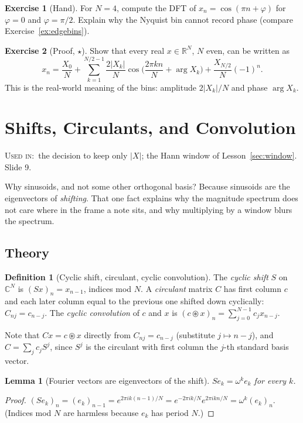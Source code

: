 \documentclass[11pt]{article}
\newtheorem{lemma}[theorem]{Lemma}
\theoremstyle{definition}
\newtheorem{definition}[theorem]{Definition}
\newtheorem{innerexercise}{Exercise}[section]
\newenvironment{exercise}[1][]{\begin{innerexercise}[#1]}{\end{innerexercise}}
\newcommand{\R}{\mathbb{R}}
\newcommand{\C}{\mathbb{C}}
\newcommand{\abs}[1]{\lvert #1\rvert}
\newcommand{\cconv}{\circledast}
\newcommand{\usedin}[1]{\par\noindent\colorbox{black!8}{\parbox{\dimexpr\linewidth-2\fboxsep\relax}{\small\textsc{Used in:}~#1}}\par\medskip}
\begin{document}
\begin{exercise}[Hand]\label{ex:nyq}
For $N=4$, compute the DFT of $x_n=\cos(\pi n+\varphi)$ for $\varphi=0$ and
$\varphi=\pi/2$. Explain why the Nyquist bin cannot record phase (compare
Exercise~\ref{ex:edgebins}).
\end{exercise}

\begin{exercise}[Proof, $\star$]\label{ex:realseries}
Show that every real $x\in\R^N$, $N$ even, can be written as
\[
x_n=\frac{X_0}N+\sum_{k=1}^{N/2-1}\frac{2\abs{X_k}}N\cos\!\Big(\frac{2\pi kn}N+\arg X_k\Big)
+\frac{X_{N/2}}N(-1)^n.
\]
This is the real-world meaning of the bins: amplitude $2\abs{X_k}/N$ and phase
$\arg X_k$.
\end{exercise}

\section{Shifts, Circulants, and Convolution}\label{sec:circ}
\usedin{the decision to keep only $\abs{X}$; the Hann window of
Lesson~\ref{sec:window}. Slide 9.}

Why sinusoids, and not some other orthogonal basis? Because sinusoids are the
eigenvectors of \emph{shifting}. That one fact explains why the magnitude spectrum
does not care where in the frame a note sits, and why multiplying by a window blurs
the spectrum.

\subsection{Theory}

\begin{definition}[Cyclic shift, circulant, cyclic convolution]
The \emph{cyclic shift} $S$ on $\C^N$ is $(Sx)_n=x_{n-1}$, indices mod $N$. A
\emph{circulant} matrix $C$ has first column $c$ and each later column equal to the
previous one shifted down cyclically: $C_{nj}=c_{n-j}$. The \emph{cyclic convolution}
of $c$ and $x$ is $(c\cconv x)_n=\sum_{j=0}^{N-1}c_jx_{n-j}$.
\end{definition}

Note that $Cx=c\cconv x$ directly from $C_{nj}=c_{n-j}$ (substitute $j\mapsto n-j$),
and $C=\sum_jc_jS^j$, since $S^j$ is the circulant with first column the $j$-th
standard basis vector.

\begin{lemma}[Fourier vectors are eigenvectors of the shift]\label{lem:shifteig}
$Se_k=\omega^ke_k$ for every $k$.
\end{lemma}
\begin{proof}
$(Se_k)_n=(e_k)_{n-1}=e^{2\pi ik(n-1)/N}=e^{-2\pi ik/N}e^{2\pi ikn/N}=\omega^k(e_k)_n$.
(Indices mod $N$ are harmless because $e_k$ has period $N$.)
\end{proof}
\end{document}
